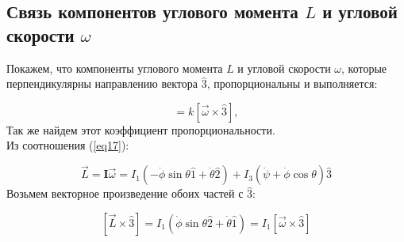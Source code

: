 \documentclass[a4paper,11.5pt]{article} %
\begin{document}
\newpage
\begin{figure}[h!]
	\label{figimage6}
\end{figure}


\subsection{Связь компонентов углового момента $L$ и угловой скорости $\omega$}
Покажем, что компоненты углового момента $L$ и угловой скорости $\omega$, которые перпендикулярны направлению вектора $\hat{3}$, пропорциональны и выполняется:

\begin{equation}
	[\vec{L} \times \hat{3}] = k\left[\overrightarrow{\omega} \times \hat{3}\right],
	\label{eq24}
\end{equation}
Так же найдем этот коэффициент пропорциональности.\\
Из соотношения (\ref{eq17}):

\begin{equation}
	\vec{L} = \textbf{I}\overrightarrow{\omega} = I_1(-\dot{\phi}\sin \theta \hat{1} + \dot{\theta}\hat{2}) + I_3(\dot{\psi} + \dot{\phi}\cos \theta)\hat{3}
	\label{eq25}
\end{equation}
Возьмем векторное произведение обоих частей с $\hat{3}$:

\begin{equation}
\boxed{
	\left[\vec{L}\times \hat{3}\right] = I_1(\dot{\phi}\sin \theta \hat{2} + \dot{\theta} \hat{1}) = I_1 \left[\overrightarrow{\omega} \times \hat{3}\right]
}
	\label{eq26}
\end{equation}
\end{document}
